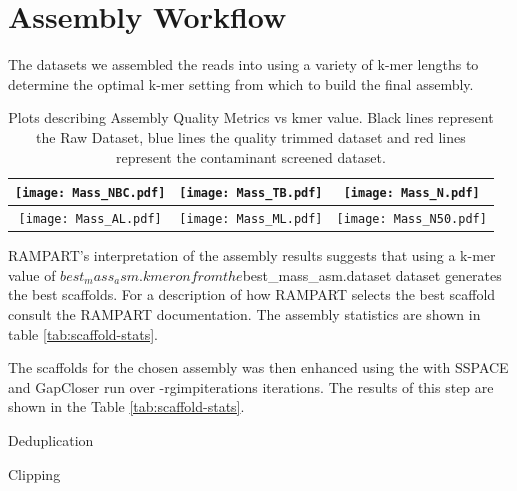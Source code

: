 \documentclass{amsart}
\begin{document}
\newpage
\section{Assembly Workflow}

The datasets we assembled the reads into using a variety of k-mer lengths to determine the optimal k-mer setting from which to build the final assembly. 

\begin{table}[H]
\begin{center}
\begin{tabular}{c|c|c}
\texttt{[image: Mass\_NBC.pdf]} & \texttt{[image: Mass\_TB.pdf]} & \texttt{[image: Mass\_N.pdf]}\\ \midrule 
\texttt{[image: Mass\_AL.pdf]} & \texttt{[image: Mass\_ML.pdf]} & \texttt{[image: Mass\_N50.pdf]} 
\end{tabular}
\end{center}
\caption{Plots describing Assembly Quality Metrics vs kmer value. Black lines represent the Raw Dataset, blue lines the quality trimmed dataset and red lines represent the contaminant screened dataset. }
\label{fig:aq_b}
\end{table}

RAMPART's interpretation of the assembly results suggests that using a k-mer value of $best_mass_asm.kmer on from the $best_mass_asm.dataset dataset generates the best scaffolds.  For a description of how RAMPART selects the best scaffold consult the RAMPART documentation.  The assembly statistics are shown in table \ref{tab:scaffold-stats}. 

The scaffolds for the chosen assembly was then enhanced using the with SSPACE and GapCloser run over -rgimpiterations iterations.  The results of this step are shown in the Table \ref{tab:scaffold-stats}.

Deduplication

Clipping
\end{document}
